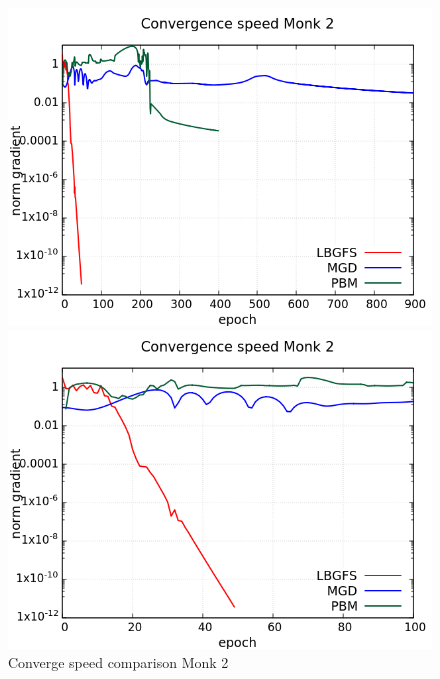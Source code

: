 \begin{figure}[H]
	\centering
	\begin{minipage}[t]{0.5\linewidth}
		\includegraphics[width=\linewidth]{data/Comparison/Monk2/Monk2_CS_Comparison_log_standard.png}
	\end{minipage}%
	\begin{minipage}[t]{0.5\linewidth}
		\includegraphics[width=\linewidth]{data/Comparison/Monk2/Monk2_CS_Comparison_log_zoom.png}
	\end{minipage}
	 \caption{Converge speed comparison Monk 2}
	 \label{CS-Monk2}
\end{figure}
